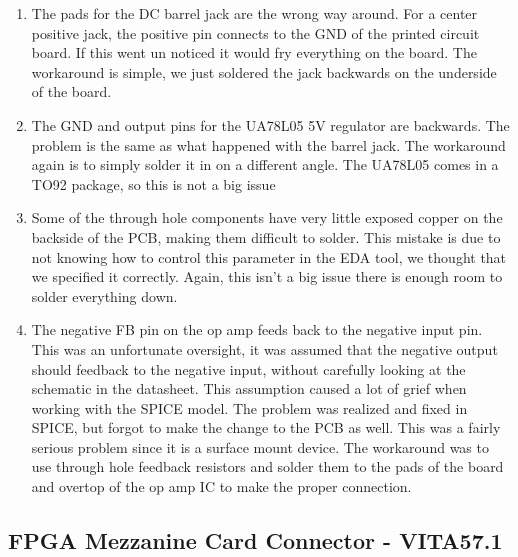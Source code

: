 \documentclass[a4paper, 12pt, notitlepage]{article}
\begin{document}
\begin{enumerate}
  \item{
    The pads for the DC barrel jack are the wrong way around.  For a center positive jack, the positive pin connects to the GND of the printed circuit board.  If this went un noticed it would fry everything on the board.  The workaround is simple, we just soldered the jack backwards on the underside of the board.
  }

  \item{
    The GND and output pins for the UA78L05 5V regulator are backwards.  The problem is the same as what happened with the barrel jack.  The workaround again is to simply solder it in on a different angle.  The UA78L05 comes in a TO92 package, so this is not a big issue
  }

  \item{
    Some of the through hole components have very little exposed copper on the backside of the PCB, making them difficult to solder.  This mistake is due to not knowing how to control this parameter in the EDA tool, we thought that we specified it correctly.  Again, this isn't a big issue there is enough room to solder everything down.
    }

  \item{ %
    The negative FB pin on the op amp feeds back to the negative input pin.  This was an unfortunate oversight, it was assumed that the negative output should feedback to the negative input, without carefully looking at the schematic in the datasheet.  This assumption caused a lot of grief when working with the SPICE model.  The problem was realized and fixed in SPICE, but forgot to make the change to the PCB as well.  This was a fairly serious problem since it is a surface mount device.  The workaround was to use through hole feedback resistors and solder them to the pads of the board and overtop of the op amp IC to make the proper connection.
  }

\end{enumerate}


\subsection{FPGA Mezzanine Card Connector - VITA57.1}

\clearpage


\end{document}
